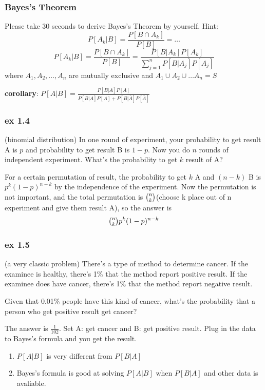 \documentclass{beamer}
\begin{document}
\begin{frame}
    \frametitle{Bayes's Theorem}
    Please take 30 seconds to derive Bayes's Theorem by yourself. Hint: 
    \[P[A_k|B]=\frac{P[B\cap A_k]}{P[B]}=\dots\]
     \[P[A_k|B]=\frac{P[B\cap A_k]}{P[B]}=\frac{P[B|A_k]P[A_k]}{\sum\limits_{j=1}^n P[B|A_j]P[A_j]}\]
    where $A_1, A_2,\dots, A_n$ are mutually exclusive and $A_1\cup A_2\cup \dots A_n=S$\par
    \vspace{0.3cm}
    \textbf{corollary}: $P[A|B]=\frac{P[B|A]P[A]}{P[B|A]P[A]+P[B|\bar{A}]P[\bar{A}]}$
    
\end{frame}

\begin{frame}
    \frametitle{ex 1.4}
    (binomial distribution) In one round of experiment, your probability to get result A is $p$ and probability to get result B is $1-p$. Now you do $n$ rounds of independent experiment. What's the probability to get $k$ result of A?\par
    \vspace{0.3cm}
     For a certain permutation of result, the probability to get $k$ A and $(n-k)$ B is $p^{k}(1-p)^{n-k}$ by the independence of the experiment. Now the permutation is not important, and the total permutation is $\tbinom{n}{k}$(choose k place out of n experiment and give them result A), so the answer is 
    \[\tbinom{n}{k} p^{k}(1-p)^{n-k}\]

\end{frame}

\begin{frame}
    \frametitle{ex 1.5}
    (a very classic problem) There's a type of method to determine cancer. If the examinee is healthy, there's 1\% that the method report positive result. If the examinee does have cancer, there's 1\% that the method report negative result.\par
    Given that 0.01\% people have this kind of cancer, what's the probability that a person who get positive result get cancer?\par
    \vspace{0.3cm}
     The answer is $\frac{1}{102}$.  Set A: get cancer and B: get positive result.
    Plug in the data to Bayes's formula and you  get the result.\par
    \vspace{0.3cm}
    \begin{enumerate}
        \item $P[A|B]$ is very different from $P[B|A]$
        \item Bayes's formula is good at solving $P[A|B]$ when $P[B|A]$ and other data is avaliable.
    \end{enumerate}
\end{frame}
\end{document}
